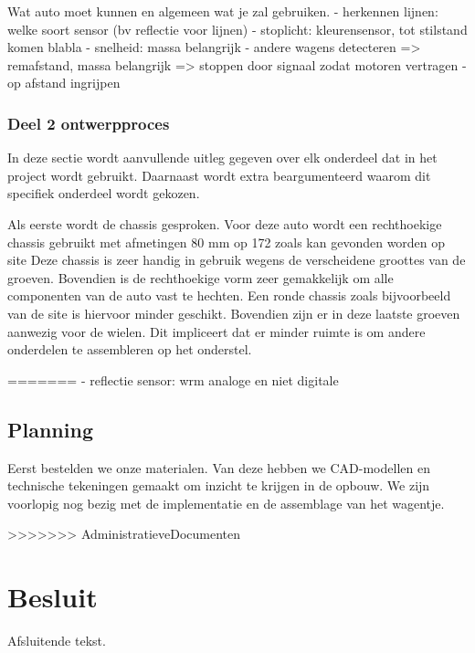 \documentclass[a4paper,twoside,kulak]{kulakreport} %
\begin{document}
Wat auto moet kunnen en algemeen wat je zal gebruiken.
- herkennen lijnen: welke soort sensor (bv reflectie voor lijnen)
- stoplicht: kleurensensor, tot stilstand komen blabla
- snelheid: massa belangrijk
- andere wagens detecteren => remafstand, massa belangrijk => stoppen door signaal zodat motoren vertragen
- op afstand ingrijpen 

\subsection{Deel 2 ontwerpproces}

In deze sectie wordt aanvullende uitleg gegeven over elk onderdeel dat in het project wordt gebruikt. Daarnaast wordt extra beargumenteerd waarom dit specifiek onderdeel wordt gekozen.

Als eerste wordt de chassis gesproken. Voor deze auto wordt een rechthoekige chassis gebruikt met afmetingen 80 mm op 172 zoals kan gevonden worden op site %
Deze chassis is zeer handig in gebruik wegens de verscheidene groottes van de groeven. Bovendien is de rechthoekige vorm zeer gemakkelijk om alle componenten van de auto vast te hechten. Een ronde chassis zoals bijvoorbeeld van de site %
is hiervoor minder geschikt. Bovendien zijn er in deze laatste groeven aanwezig voor de wielen. Dit impliceert dat er minder ruimte is om andere onderdelen te assembleren op het onderstel. 






=======
- reflectie sensor: wrm analoge en niet digitale
\section{Planning}
Eerst bestelden we onze materialen. Van deze hebben we CAD-modellen en technische tekeningen gemaakt om inzicht te krijgen in de opbouw. We zijn voorlopig nog bezig met de implementatie en de assemblage van het wagentje.





>>>>>>> AdministratieveDocumenten
\chapter*{Besluit}
Afsluitende tekst.





\end{document}
